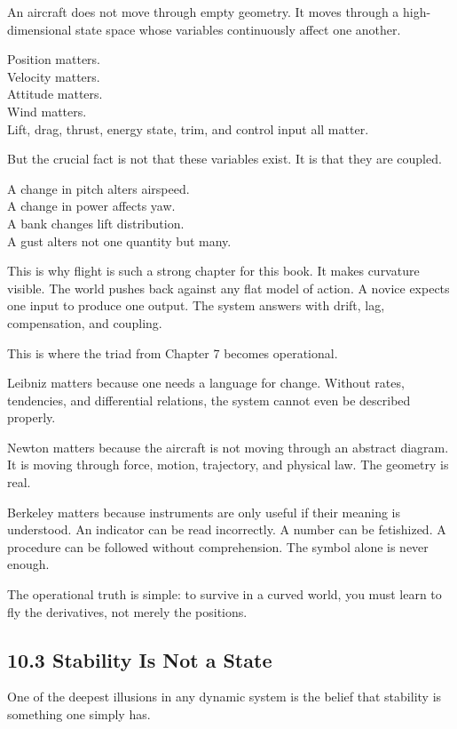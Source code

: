 \documentclass[
]{article}
\begin{document}
An aircraft does not move through empty geometry. It moves through a
high-dimensional state space whose variables continuously affect one
another.

Position matters.\\
Velocity matters.\\
Attitude matters.\\
Wind matters.\\
Lift, drag, thrust, energy state, trim, and control input all matter.

But the crucial fact is not that these variables exist. It is that they
are coupled.

A change in pitch alters airspeed.\\
A change in power affects yaw.\\
A bank changes lift distribution.\\
A gust alters not one quantity but many.

This is why flight is such a strong chapter for this book. It makes
curvature visible. The world pushes back against any flat model of
action. A novice expects one input to produce one output. The system
answers with drift, lag, compensation, and coupling.

This is where the triad from Chapter 7 becomes operational.

Leibniz matters because one needs a language for change. Without rates,
tendencies, and differential relations, the system cannot even be
described properly.

Newton matters because the aircraft is not moving through an abstract
diagram. It is moving through force, motion, trajectory, and physical
law. The geometry is real.

Berkeley matters because instruments are only useful if their meaning is
understood. An indicator can be read incorrectly. A number can be
fetishized. A procedure can be followed without comprehension. The
symbol alone is never enough.

The operational truth is simple: to survive in a curved world, you must
learn to fly the derivatives, not merely the positions.

\hypertarget{stability-is-not-a-state}{%
\subsection{10.3 Stability Is Not a
State}\label{stability-is-not-a-state}}

One of the deepest illusions in any dynamic system is the belief that
stability is something one simply has.
\end{document}
